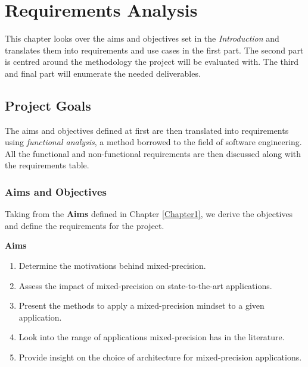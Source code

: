 \chapter{Requirements Analysis} %

\label{Chapter3} %



This chapter looks over the aims and objectives set in the \emph{Introduction} and translates them into requirements and use cases in the first part. The second part is centred around the methodology the project will be evaluated with. The third and final part will enumerate the needed deliverables.

\section{Project Goals}

The aims and objectives defined at first are then translated into requirements using \emph{functional analysis}, a method borrowed to the field of software engineering. All the functional and non-functional requirements are then discussed along with the requirements table.


\subsection{Aims and Objectives}

Taking from the \textbf{Aims} defined in Chapter \ref{Chapter1}, we derive the objectives and define the requirements for the project.

\textbf{Aims}

\begin{enumerate}
  \item Determine the motivations behind mixed-precision.
  \item Assess the impact of mixed-precision on state-to-the-art applications.
  \item Present the methods to apply a mixed-precision mindset to a given application.
  \item Look into the range of applications mixed-precision has in the literature.
  \item Provide insight on the choice of architecture for mixed-precision applications.
\end{enumerate}

